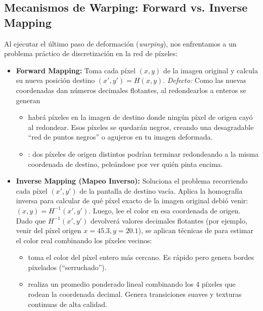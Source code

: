 \subsection{Mecanismos de Warping: Forward vs. Inverse Mapping}
\noindent
Al ejecutar el último paso de deformación (\textit{warping}), nos enfrentamos a un problema práctico de discretización en la red de píxeles:
\begin{itemize}
    \item \textbf{Forward Mapping:} Toma cada píxel $(x,y)$ de la imagen original y calcula su nueva posición destino $(x', y') = H(x,y)$. \textit{Defecto:} Como las nuevas coordenadas dan números decimales flotantes, al redondearlos a enteros se generan 
    \begin{itemize}
        \item {} habrá píxeles en la imagen de destino donde ningún píxel de origen cayó al redondear. Esos píxeles se quedarán negros, creando una desagradable ``red de puntos negros'' o agujeros en tu imagen deformada.
        \item {}: dos píxeles de origen distintos podrían terminar redondeando a la misma coordenada de destino, peleándose por ver quién pinta encima.
    \end{itemize}    

    \item \textbf{Inverse Mapping (Mapeo Inverso):} Soluciona el problema recorriendo cada píxel $(x', y')$ de la pantalla de destino vacía. Aplica la homografía inversa para calcular de qué píxel exacto de la imagen original debió venir: $(x, y) = H^{-1}(x', y')$. Luego, lee el color en esa coordenada de origen. \\
    
    \noindent
    Dado que $H^{-1}(x', y')$ devolverá valores decimales flotantes (por ejemplo, venir del píxel origen $x=45.3, y=20.1$), se aplican técnicas de  para estimar el color real combinando los píxeles vecinos:
    \begin{itemize}
        \item {} toma el color del píxel entero más cercano. Es rápido pero genera bordes pixelados (``serruchado'').
        \item {} realiza un promedio ponderado lineal combinando los 4 píxeles que rodean la coordenada decimal. Genera transiciones suaves y texturas continuas de alta calidad.
    \end{itemize}
\end{itemize}

